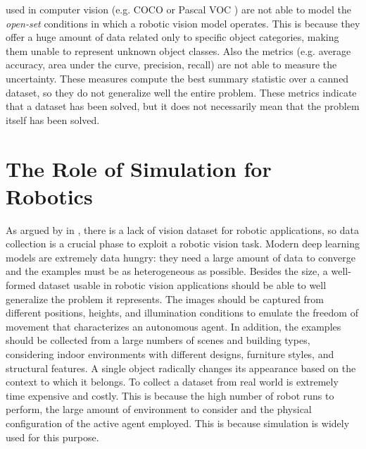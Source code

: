 used in computer vision (e.g. COCO \cite{coco} or Pascal VOC \cite{pascal}) are not able to model the \textit{open-set} conditions in which a robotic vision model operates. This is because they offer a huge amount of data related only to specific object categories, making them unable to represent unknown object classes. Also the metrics (e.g. average accuracy, area under the curve, precision, recall) are not able to measure the uncertainty. These measures compute the best summary statistic over a canned dataset, so they do not generalize well the entire problem. These metrics indicate that a dataset has been solved, but it does not necessarily mean that the problem itself has been solved.  
 
 
 \section{The Role of Simulation for Robotics}
 
 As argued by \citeauthor{surveydeeplimits} in \cite{surveydeeplimits}, there is a lack of vision dataset for robotic applications, so data collection is a crucial phase to exploit a robotic vision task. Modern deep learning models are extremely data hungry: they need a large amount of data to converge and the examples must be as heterogeneous as possible. Besides the size, a well-formed dataset usable in robotic vision applications should be able to well generalize the problem it represents. The images should be captured from different positions, heights, and illumination conditions to emulate the freedom of movement that characterizes an autonomous agent. In addition, the examples should be collected from a large numbers of scenes and building types, considering indoor environments with different designs, furniture styles, and structural features. A single object radically changes its appearance based on the context to which it belongs. To collect a dataset from real world is extremely time expensive and costly. This is because the high number of robot runs to perform, the large amount of environment to consider and the physical configuration of the active agent employed. This is because simulation is widely used for this purpose. 
 
